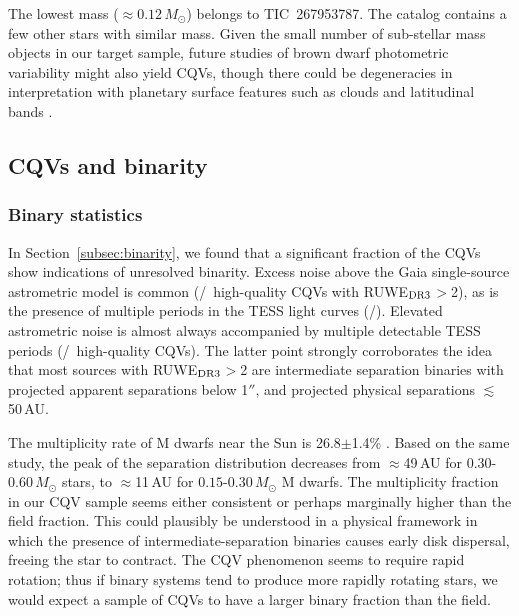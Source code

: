 \documentclass[11pt,twocolumn,tighten]{aastex63}
\begin{document}
The lowest mass ($\approx$$0.12$\,$M_\odot$) belongs to TIC~267953787.
The catalog contains a few other stars with similar mass.  Given the
small number of sub-stellar mass objects in our target sample, future
studies of brown dwarf photometric variability might also yield CQVs,
though there could be degeneracies in interpretation with planetary
surface features such as clouds and latitudinal bands
\citep[e.g.][]{2021ApJ...906...64A,2022ApJ...924...68V}.


\subsection{CQVs and binarity}
\label{subsec:discbinary}

\subsubsection{Binary statistics}

In Section~\ref{subsec:binarity}, we found that a significant fraction
of the CQVs show indications of unresolved binarity.  Excess noise
above the Gaia single-source astrometric model is common
(\ngoodhighruwe/\ngoods\ high-quality CQVs with RUWE$_{\rm DR3}$$>$2),
as is the presence of multiple periods in the TESS light curves
(\ngoodmultperiodflag/\ngoods).  Elevated astrometric noise is almost
always accompanied by multiple detectable TESS periods
(\ngoodruweandmultperiod/\ngoodhighruwe\ high-quality CQVs).  The
latter point strongly corroborates the idea that most sources with
RUWE$_{\rm DR3}$$>$2 are intermediate separation binaries with
projected apparent separations below 1$''$, and projected physical
separations $\lesssim$50\,AU.

The multiplicity rate of M dwarfs near the Sun is 26.8$\pm$1.4\%
\citep{2019AJ....157..216W}.  Based on the same study, the peak of the
separation distribution decreases from $\approx$49\,AU for
$0.30$-$0.60$\,$M_\odot$ stars, to $\approx$11\,AU for
$0.15$-$0.30$\,$M_\odot$ M dwarfs.  The multiplicity fraction in our
CQV sample seems either consistent or perhaps marginally higher than
the field fraction.  This could plausibly be understood in a physical
framework in which the presence of intermediate-separation binaries
causes early disk dispersal, freeing the star to contract.  The CQV
phenomenon seems to require rapid rotation; thus if binary systems
tend to produce more rapidly rotating stars, we would expect a sample
of CQVs to have a larger binary fraction than the field.
\end{document}
